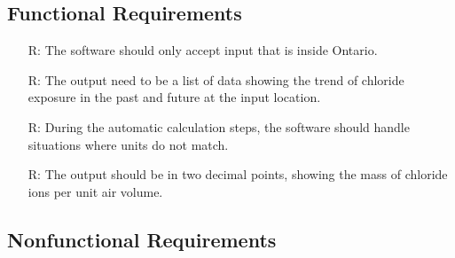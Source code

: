 \documentclass[12pt, titlepage]{article}
\newcounter{reqnum} %
\begin{document}
\subsection{Functional Requirements}

\begin{itemize}

\item[R\refstepcounter{reqnum}\thereqnum \label{R_Inputs}:] The software should only accept input that is inside Ontario.

\item[R\refstepcounter{reqnum}\thereqnum \label{R_OutputInputs}:] The output need to be a list of data showing the trend of chloride exposure in the past and future at the input location.

\item[R\refstepcounter{reqnum}\thereqnum \label{R_Calculate}:] During the automatic calculation steps, the software should handle situations where units do not match.

\item[R\refstepcounter{reqnum}\thereqnum \label{R_Output}:] The output should be in two decimal points, showing the mass of chloride ions per unit air volume.


\end{itemize}


\subsection{Nonfunctional Requirements}
\end{document}
